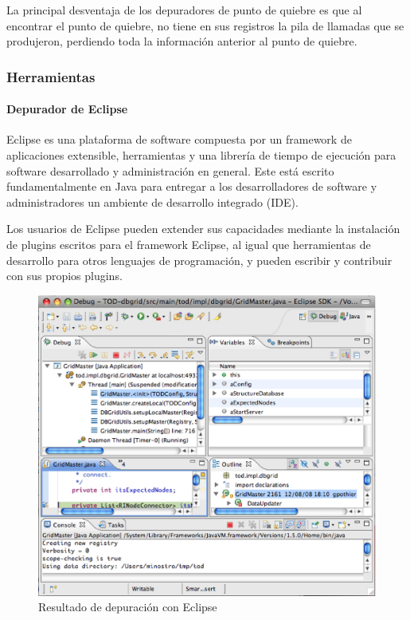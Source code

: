 \documentclass[12pt,legalpaper]{report}
\begin{document}
La principal desventaja de los depuradores de punto de quiebre es que al encontrar el punto de quiebre, no tiene en sus registros la pila de llamadas que se produjeron, perdiendo toda la información anterior al punto de quiebre.

			\subsubsection{Herramientas}

				\paragraph{Depurador de Eclipse}
				
Eclipse es una plataforma de software compuesta por un framework de aplicaciones extensible, herramientas y una librería de tiempo de ejecución para software desarrollado y administración en general.  Este está escrito fundamentalmente en Java para entregar a los desarrolladores de software y administradores un ambiente de desarrollo integrado (IDE).

Los usuarios de Eclipse pueden extender sus capacidades mediante la instalación de plugins escritos para el framework Eclipse, al igual que herramientas de desarrollo para otros lenguajes de programación, y pueden escribir y contribuir con sus propios plugins.

\begin{figure}[hbp]
	\centering
	\includegraphics[scale=0.35]{images/Eclipse.eps}
	\caption{Resultado de depuración con Eclipse}
\end{figure}
		
\end{document}
